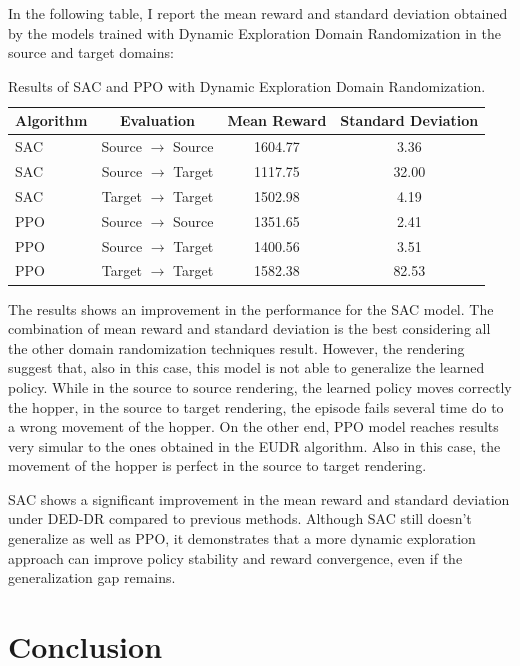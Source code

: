 \documentclass[11pt]{article}
\begin{document}
In the following table, I report the mean reward and standard deviation obtained by the models trained with Dynamic Exploration Domain Randomization in the source and target domains:

\begin{table}[H]
    \centering
    \begin{tabular}{|l|c|c|c|}
        \hline
        \textbf{Algorithm} & \textbf{Evaluation} & \textbf{Mean Reward} & \textbf{Standard Deviation} \\ \hline
        SAC & Source $\rightarrow$ Source & 1604.77 & 3.36 \\ 
        SAC & Source $\rightarrow$ Target & 1117.75 & 32.00 \\ 
        SAC & Target $\rightarrow$ Target & 1502.98 & 4.19 \\ \hline
        PPO & Source $\rightarrow$ Source & 1351.65 & 2.41 \\ 
        PPO & Source $\rightarrow$ Target & 1400.56 & 3.51 \\ 
        PPO & Target $\rightarrow$ Target & 1582.38 & 82.53 \\ \hline
    \end{tabular}
    \caption{Results of SAC and PPO with Dynamic Exploration Domain Randomization.}
    \label{tab:results_dedr}
\end{table}

The results shows an improvement in the performance for the SAC model. The combination of mean reward and standard deviation is the best considering all the other domain randomization techniques result. However, the rendering suggest that, also in this case, this model is not able to generalize the learned policy. While in the source to source rendering, the learned policy moves correctly the hopper, in the source to target rendering, the episode fails several time do to a wrong movement of the hopper. 
On the other end, PPO model reaches results very simular to the ones obtained in the EUDR algorithm. Also in this case, the movement of the hopper is perfect in the source to target rendering. 

SAC shows a significant improvement in the mean reward and standard deviation under DED-DR compared to previous methods. Although SAC still doesn't generalize as well as PPO, it demonstrates that a more dynamic exploration approach can improve policy stability and reward convergence, even if the generalization gap remains.

\section{Conclusion}
\end{document}
